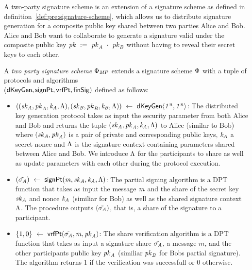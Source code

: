 A two-party signature scheme is an extension of a signature scheme as defined in definition~\ref{def:pre:signature-scheme}, which allows us to distribute signature generation for a composite public key shared between two parties Alice and Bob.
Alice and Bob want to collaborate to generate a signature valid under the composite public key $\mathit{pk} ~:=~ \mathit{pk}_{\mathit{A}} ~\cdot~ \mathit{pk}_{\mathit{B}}$ without having to reveal their secret keys to each other.

\begin{definition}
    \label{def:sig:two-party-sig}

    A \emph{two party signature scheme $\Phi_{\mathit{MP}}$} extends a signature scheme $\Phi$ with a tuple of protocols and algorithms\\
    ($\mathsf{dKeyGen}, \mathsf{signPt} , \mathsf{vrfPt}, \mathsf{finSig})$ defined as follows:

    \begin{itemize}
        \item $((\mathit{sk}_{\mathit{A}}, \mathit{pk}_{\mathit{A}}, \mathit{\mathit{k}_{\mathit{A}}}, \Lambda), (\mathit{sk}_{\mathit{B}}, \mathit{pk}_{\mathit{B}}, \mathit{\mathit{k}_{\mathit{B}}}, \Lambda)) ~\leftarrow~ \mathsf{dKeyGen}\langle \mathit{1^n}, \mathit{1^n} \rangle$: The distributed key generation protocol takes as input the security parameter from both Alice and Bob and returns
        the tuple $(\mathit{sk}_{\mathit{A}}, \mathit{pk}_{\mathit{A}}, \mathit{\mathit{k}_{\mathit{A}}}, \Lambda)$ to Alice (similar to Bob) where $(\mathit{sk}_{\mathit{A}}, \mathit{pk}_{\mathit{A}})$ is a pair of private and corresponding public keys, $\mathit{\mathit{k}_{\mathit{A}}}$ a secret nonce and $\Lambda$ is the signature context containing parameters shared between Alice and Bob.
        We introduce $\Lambda$ for the participants to share as well as update parameters with each other during the protocol execution.

        \item $(\tilde{\sigma_{\mathit{A}}}) ~\leftarrow~ \mathsf{signPt}(\mathit{m}, \mathit{sk}_{\mathit{A}}, \mathit{\mathit{k}_{\mathit{A}}}, \Lambda)$: The partial signing algorithm is a DPT function that takes as input the message $\mathit{m}$ and the share of the secret key $\mathit{sk}_{\mathit{A}}$ and nonce $\mathit{\mathit{k}_{\mathit{A}}}$ (similiar for Bob) as well
        as the shared signature context $\Lambda$. The procedure outputs $(\tilde{\sigma_{\mathit{A}}})$, that is, a share of the signature to a participant.

        \item $\{1,0\} ~\leftarrow~ \mathsf{vrfPt}(\tilde{\sigma_{\mathit{A}}}, \mathit{m}, \mathit{pk}_{\mathit{A}})$: The share verification algorithm is a DPT function that takes as input a signature share $\tilde{\sigma_{\mathit{A}}}$, a message $m$, and the other participants public key $\mathit{pk}_{\mathit{A}}$ (similiar $\mathit{pk}_{\mathit{B}}$ for Bobs partial signature). The algorithm returns 1 if the verification was successfull or 0 otherwise.


\end{itemize}
\end{definition}
